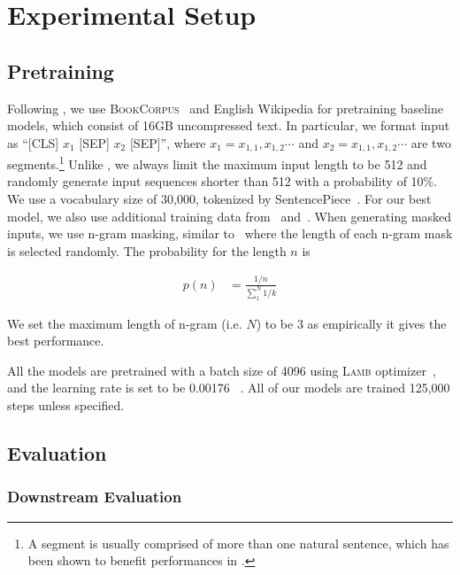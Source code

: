 \section{Experimental Setup}

\subsection{Pretraining}

Following \bert\citep{devlin2018bert}, we use \textsc{BookCorpus}~\citep{zhu2015aligning} and English Wikipedia for pretraining baseline models, which consist of 16GB uncompressed text. In particular, we format input as ``\textsc{[CLS]} $x_1$ \textsc{[SEP]} $x_2$ \textsc{[SEP]}'', where $x_1=x_{1,1},x_{1,2}\cdots$ and $x_2=x_{1,1},x_{1,2}\cdots$ are two segments.\footnote{A segment is usually comprised of more than one natural sentence, which has been shown to benefit performances in \cite{liu2019roberta}.} Unlike \bert, we always limit the maximum input length to be 512 and randomly generate input sequences shorter than 512 with a probability of 10\%. We use a vocabulary size of 30,000, tokenized by SentencePiece~\citep{kudo-richardson-2018-sentencepiece}. For our best model, we also use additional training data from~\cite{liu2019roberta} and~\cite{yang2019xlnet}. When generating masked inputs, we use n-gram masking, similar to~\cite{joshi2019spanbert} where the length of each n-gram mask is selected randomly. The probability for the length $n$ is


\begin{align}
    p(n) &= \frac{1/n}{\sum_1^N{1/k}}
\end{align}

We set the maximum length of n-gram (i.e. $N$) to be 3 as empirically it gives the best performance.

All the models are pretrained with a batch size of 4096 using \textsc{Lamb} optimizer~\citep{you2019reducing}, and the learning rate is set to be 0.00176 ~\citep{you2019reducing}. All of our models are trained 125,000 steps unless specified. 


\subsection{Evaluation}

\subsubsection{Downstream Evaluation}

